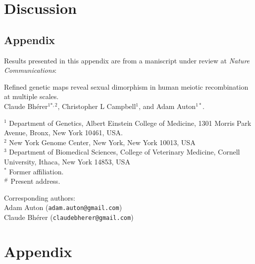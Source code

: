 \documentclass[11pt,twoside,openright,letterpaper]{memoir}
\begin{document}


\chapter{Discussion} \label{ch:discussion}


\backmatter

\begin{SingleSpace}
\chapter{Appendix}


\vspace{0.5cm}
\noindent Results presented in this appendix are from a maniscript under review at \textit{Nature Communications}:

\vspace{0.5cm}
\noindent Refined genetic maps reveal sexual dimorphism in human meiotic recombination at multiple scales. \\

\noindent Claude Bh\'{e}rer$^{1*,2}$, Christopher L Campbell$^1$, and Adam Auton$^{1*}$.

\vspace{0.5cm}
\noindent $^1$ Department of Genetics, Albert Einstein College of Medicine, 1301 Morris Park Avenue, Bronx, New York 10461, USA. \\
\noindent $^2$ New York Genome Center, New York, New York 10013, USA \\
\noindent $^3$ Department of Biomedical Sciences, College of Veterinary Medicine, Cornell University, Ithaca, New York 14853, USA \\
\noindent $^*$ Former affiliation. \\
\noindent $^\#$ Present address.

\vspace{0.5cm}
\begin{centering}
    Corresponding authors: \\
    Adam Auton (\texttt{adam.auton@gmail.com}) \\
    Claude Bh\'{e}rer (\texttt{claudebherer@gmail.com}) \\
\end{centering}
\end{SingleSpace}



\chapter{Appendix}
%
%
%
%

\end{document}
